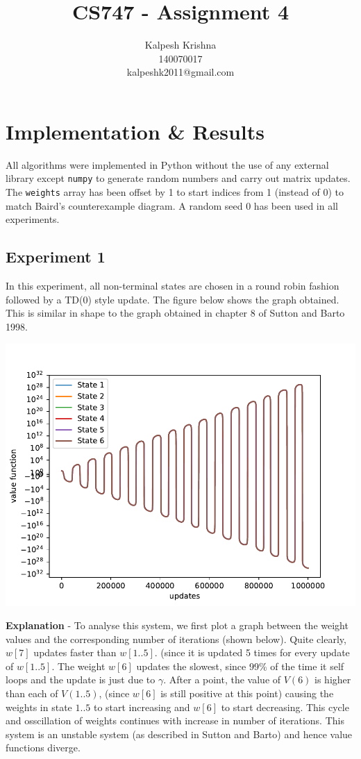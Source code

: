 \documentclass[11pt]{article}
\title{\textbf{CS747 - Assignment 4}}
\author{Kalpesh Krishna\\140070017\\kalpeshk2011@gmail.com}
\date{}
\begin{document}
\maketitle

\section{Implementation \& Results}
All algorithms were implemented in Python without the use of any external library except \texttt{numpy} to generate random numbers and carry out matrix updates. The \texttt{weights} array has been offset by 1 to start indices from 1 (instead of 0) to match Baird's counterexample diagram. A random seed 0 has been used in all experiments.
\subsection{Experiment 1}
In this experiment, all non-terminal states are chosen in a round robin fashion followed by a TD($0$) style update. The figure below shows the graph obtained. This is similar in shape to the graph obtained in chapter 8 of Sutton and Barto 1998.
\begin{center}
\includegraphics[width=15cm]{expt1.pdf}
\end{center}
\textbf{Explanation} - To analyse this system, we first plot a graph between the weight values and the corresponding number of iterations (shown below). Quite clearly, $w[7]$ updates faster than $w[1..5]$. (since it is updated 5 times for every update of $w[1..5]$. The weight $w[6]$ updates the slowest, since 99\% of the time it self loops and the update is just due to $\gamma$. After a point, the value of $V(6)$ is higher than each of $V(1..5)$, (since $w[6]$ is still positive at this point) causing the weights in state $1..5$ to start increasing and $w[6]$ to start decreasing. This cycle and osscillation of weights continues with increase in number of iterations. This system is an unstable system (as described in Sutton and Barto) and hence value functions diverge. 
\end{document}
